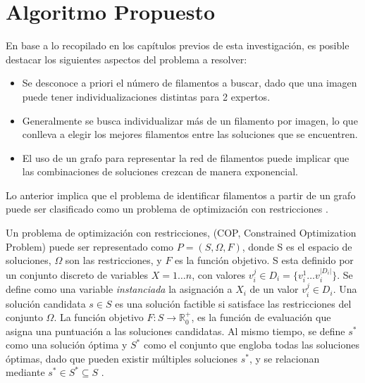 \chapter{Algoritmo Propuesto}
\label{sec:modeloOpti}

En base a lo recopilado en los cap\'itulos previos de esta investigaci\'on, es posible destacar los siguientes aspectos del problema a resolver:

\begin{itemize}
    \item Se desconoce a priori el n\'umero de filamentos a buscar, dado que una imagen puede tener individualizaciones distintas para 2 expertos.
    \item Generalmente se busca individualizar m\'as de un filamento por imagen, lo que conlleva a elegir los mejores filamentos entre las soluciones que se encuentren.
    \item El uso de un grafo para representar la red de filamentos puede implicar que las combinaciones de soluciones crezcan de manera exponencial.
\end{itemize}

Lo anterior implica que el problema de identificar filamentos a partir de un grafo puede ser clasificado como un problema de optimizaci\'on con restricciones \cite{blum2011hybrid}.

Un problema de optimización con restricciones, (COP, Constrained Optimization Problem) puede ser representado como $P = (S, \Omega, F)$, donde S es el espacio de soluciones, $\Omega$ son las restricciones, y $F$ es la funci\'on objetivo. S esta definido por un conjunto discreto de variables $X = 1 \dotsc n$, con valores $v_{i}^{j} \in D_{i} = \{v_{i}^{1} \dotsc  v_{i}^{|D_{i}|}\}$. Se define como una variable {\it instanciada} la asignaci\'on a $X_i$ de un valor $v_{i}^{j} \in D_i$. Una solución candidata $s \in S$ es una soluci\'on factible si satisface las restricciones del conjunto $\Omega$. La funci\'on objetivo $F: S\rightarrow \mathbb R_{0}^{+}$, es la funci\'on de evaluaci\'on que asigna una puntuaci\'on a las soluciones candidatas. Al mismo tiempo, se define $s^{*}$ como una soluci\'on \'optima y $S^{*}$ como el conjunto que engloba todas las soluciones \'optimas, dado que pueden existir m\'ultiples soluciones $s^{*}$, y se relacionan mediante $s^{*} \in S^{*} \subseteq S $ \cite{socha2008ant}.


